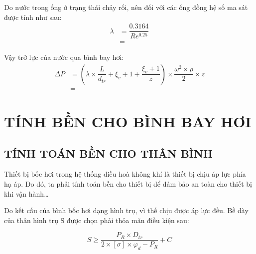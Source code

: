 Do nước trong ống ở trạng thái chảy rối, nên đối với các ống đồng hệ số ma sát được tính như sau:
\begin{equation*}
	\begin{split}
		\lambda &= \dfrac{0.3164}{Re^{0.25}}\\
		&=  
	\end{split}
\end{equation*}

Vậy trở lực của nước qua bình bay hơi:
\begin{equation*}
	\begin{split}
		\Delta P &= \left(\lambda\times\dfrac{L}{d_{tr}} +\xi_{v} + 1 + \dfrac{\xi_{v} + 1}{z}\right)\times \dfrac{\omega^2\times\rho}{2}\times z\\
		&=  
	\end{split}
\end{equation*}

\section{TÍNH BỀN CHO BÌNH BAY HƠI}
\subsection{TÍNH TOÁN BỀN CHO THÂN BÌNH}
Thiết bị bốc hơi trong hệ thống điều hoà không khí là thiết bị chịu áp lực phía hạ áp. Do đó, ta phải tính toán bền cho thiết bị để đảm bảo an toàn cho thiết bị khi vận hành…

Do kết cấu của bình bốc hơi dạng hình trụ, vì thế chịu được áp lực đều. Bề dày của thân hình trụ S được chọn phải thỏa mãn điều kiện sau:

\begin{equation*}
	S \geq \dfrac{P_{R}\times D_{tr}}{2\times [\sigma]\times\varphi_{d} - P_{R}} + C
\end{equation*}

